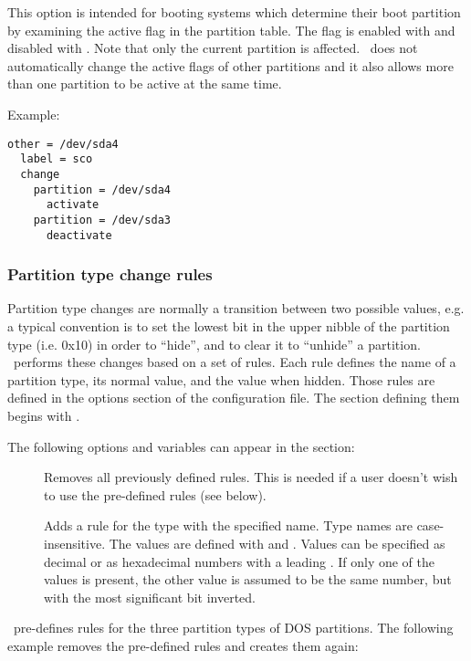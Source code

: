 This option is intended for booting systems which determine their boot
partition by examining the active flag in the partition table. The flag
is enabled with  and disabled with .
Note that only the current partition is affected. \LILO\ does not
automatically change the active flags of other partitions and it also
allows more than one partition to be active at the same time.

Example:

\begin{verbatim}
other = /dev/sda4
  label = sco
  change
    partition = /dev/sda4
      activate
    partition = /dev/sda3
      deactivate
\end{verbatim}


\subsubsection{Partition type change rules}
\label{ptcr}

Partition type changes are normally a transition between two possible values,
e.g. a typical convention is to set the lowest bit in the upper nibble of the
partition type (i.e. 0x10) in order to
``hide'', and to clear it to ``unhide'' a partition. \LILO\ performs these
changes based on a set of rules. Each rule defines the name of a partition
type, its normal value, and the value when hidden. Those rules are defined
in the options section of the configuration file. The section defining
them begins with .

The following options and variables can appear in the section:
\begin{description}
  \item[] Removes all previously defined rules. This is needed
    if a user doesn't wish to use the pre-defined rules (see below).
  \item[] Adds a rule for the type with the specified
    name. Type names are case-insensitive.
    The values are defined with  and
    . Values can be specified as decimal or as
    hexadecimal numbers with a leading . If only one of the values
    is present, the other value is assumed to be the same number,
    but with the most significant bit inverted.
\end{description}

\LILO\ pre-defines rules for the three partition types of DOS partitions.
The following example removes the pre-defined rules and creates them again:

